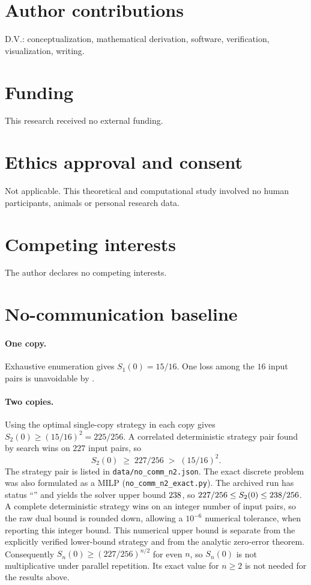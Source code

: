 \documentclass[12pt,a4paper]{article}
\theoremstyle{definition}
\theoremstyle{remark}
\begin{document}
\section*{Author contributions}
D.V.: conceptualization, mathematical derivation, software, verification, visualization, writing.

\section*{Funding}
This research received no external funding.

\section*{Ethics approval and consent}
Not applicable. This theoretical and computational study involved no human participants, animals or personal research data.

\section*{Competing interests}
The author declares no competing interests.

\appendix

\section{No-communication baseline}
\label{app:nocomm}

\paragraph{One copy.} Exhaustive enumeration gives $S_1(0)=15/16$. One loss among the $16$ input pairs is unavoidable by .

\paragraph{Two copies.} Using the optimal single-copy strategy in each copy gives $S_2(0)\ge(15/16)^2=225/256$. A correlated deterministic strategy pair found by search wins on $227$ input pairs, so
\[
  S_2(0)\;\ge\;227/256\;>\;(15/16)^2 .
\]
The strategy pair is listed in \texttt{data/no\_comm\_n2.json}. The exact discrete problem was also formulated as a MILP (\texttt{no\_comm\_n2\_exact.py}). The archived run has status ``\NtwoStatus'' and yields the solver upper bound $238$, so $227/256\le S_2(0)\le238/256$. A complete deterministic strategy wins on an integer number of input pairs, so the raw dual bound is rounded down, allowing a $10^{-6}$ numerical tolerance, when reporting this integer bound. This numerical upper bound is separate from the explicitly verified lower-bound strategy and from the analytic zero-error theorem.
Consequently $S_n(0)\ge(227/256)^{n/2}$ for even $n$, so $S_n(0)$ is not multiplicative under parallel repetition. Its exact value for $n\ge2$ is not needed for the results above.
\end{document}
